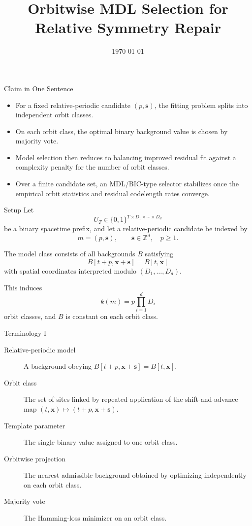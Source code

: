 \documentclass[aspectratio=169]{beamer}
\title{Orbitwise MDL Selection for Relative Symmetry Repair}
\author{}
\date{\today}
\begin{document}
\begin{frame}
  \titlepage
\end{frame}

\begin{frame}{Claim in One Sentence}
  \begin{itemize}
    \item For a fixed relative-periodic candidate $(p,\mathbf{s})$, the fitting problem splits into independent orbit classes.
    \item On each orbit class, the optimal binary background value is chosen by majority vote.
    \item Model selection then reduces to balancing improved residual fit against a complexity penalty for the number of orbit classes.
    \item Over a finite candidate set, an MDL/BIC-type selector stabilizes once the empirical orbit statistics and residual codelength rates converge.
  \end{itemize}
\end{frame}

\begin{frame}{Setup}
  Let
  \[
    U_T \in \{0,1\}^{T \times D_1 \times \cdots \times D_d}
  \]
  be a binary spacetime prefix, and let a relative-periodic candidate be indexed by
  \[
    m = (p,\mathbf{s}), \qquad \mathbf{s} \in \mathbb{Z}^d, \quad p \ge 1.
  \]

  The model class consists of all backgrounds $B$ satisfying
  \[
    B[t+p,\mathbf{x}+\mathbf{s}] = B[t,\mathbf{x}]
  \]
  with spatial coordinates interpreted modulo $(D_1,\dots,D_d)$.

  \vspace{0.5em}
  This induces
  \[
    k(m) = p \prod_{i=1}^d D_i
  \]
  orbit classes, and $B$ is constant on each orbit class.
\end{frame}

\begin{frame}{Terminology I}
  \begin{description}
    \item[Relative-periodic model] A background obeying $B[t+p,\mathbf{x}+\mathbf{s}] = B[t,\mathbf{x}]$.
    \item[Orbit class] The set of sites linked by repeated application of the shift-and-advance map $(t,\mathbf{x}) \mapsto (t+p,\mathbf{x}+\mathbf{s})$.
    \item[Template parameter] The single binary value assigned to one orbit class.
    \item[Orbitwise projection] The nearest admissible background obtained by optimizing independently on each orbit class.
    \item[Majority vote] The Hamming-loss minimizer on an orbit class.
  \end{description}
\end{frame}
\end{document}

